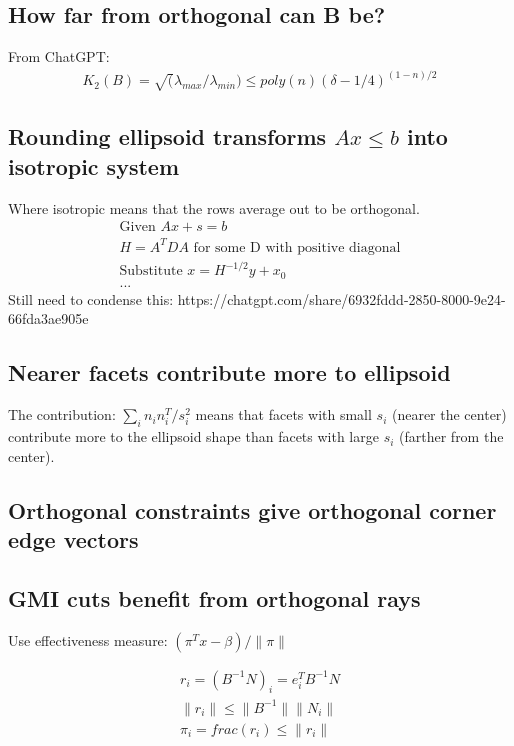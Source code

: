 \documentclass[11pt]{article}
\theoremstyle{definition}
\theoremstyle{remark}
\begin{document}
\subsection{How far from orthogonal can B be?}
From ChatGPT:
\begin{align}
    K_2(B)=\sqrt(\lambda_{max} / \lambda_{min}) \leq poly(n)(\delta - 1/4)^{(1-n)/2}
\end{align}

\subsection{Rounding ellipsoid transforms $Ax \leq b$ into isotropic system}
Where isotropic means that the rows average out to be orthogonal.
\begin{align}
    \text{Given } Ax + s = b \\
    H = A^T D A \text{ for some D with positive diagonal} \\
    \text{Substitute } x = H^{-1/2} y + x_0 \\
    ...
\end{align}
Still need to condense this: https://chatgpt.com/share/6932fddd-2850-8000-9e24-66fda3ae905e

\subsection{Nearer facets contribute more to ellipsoid}
The contribution: $\sum_i {n_i n_i^T} / s_i^2$ means that facets with small $s_i$ (nearer the center) contribute more to the ellipsoid shape than facets with large $s_i$ (farther from the center).

\subsection{Orthogonal constraints give orthogonal corner edge vectors}

\subsection{GMI cuts benefit from orthogonal rays}

Use effectiveness measure: $(\pi^T x - \beta) / \| \pi \|$

\begin{align}
    r_i = (B^{-1} N)_i = e^T_i B^{-1} N \\
    \|r_i\| \leq \| B^{-1} \| \| N_i \| \\
    \pi_i = frac(r_i) \leq \|r_i\|
\end{align}
\end{document}
